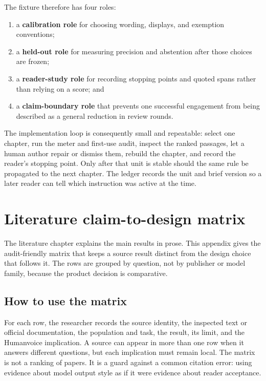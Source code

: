 The fixture therefore has four roles:

\begin{enumerate}
\item a \textbf{calibration role} for choosing wording, displays, and
      exemption conventions;
\item a \textbf{held-out role} for measuring precision and abstention after
      those choices are frozen;
\item a \textbf{reader-study role} for recording stopping points and quoted
      spans rather than relying on a score; and
\item a \textbf{claim-boundary role} that prevents one successful engagement
      from being described as a general reduction in review rounds.
\end{enumerate}

The implementation loop is consequently small and repeatable: select one
chapter, run the meter and first-use audit, inspect the ranked passages, let a
human author repair or dismiss them, rebuild the chapter, and record the
reader's stopping point. Only after that unit is stable should the same rule
be propagated to the next chapter. The ledger records the unit and brief
version so a later reader can tell which instruction was active at the time.

\section{Literature claim-to-design matrix}
\label{app:literature-matrix}

The literature chapter explains the main results in prose. This appendix gives
the audit-friendly matrix that keeps a source result distinct from the design
choice that follows it. The rows are grouped by question, not by publisher or
model family, because the product decision is comparative.

\subsection{How to use the matrix}

For each row, the researcher records the source identity, the inspected text
or official documentation, the population and task, the result, its limit,
and the Humanvoice implication. A source can appear in more than one row when
it answers different questions, but each implication must remain local. The
matrix is not a ranking of papers. It is a guard against a common citation
error: using evidence about model output style as if it were evidence about
reader acceptance.

